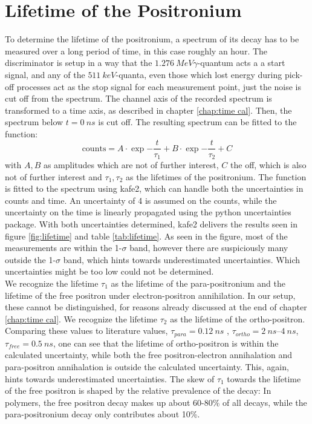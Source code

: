 \section{Lifetime of the Positronium}

To determine the lifetime of the positronium, a spectrum of its decay has to be measured over a long period of time, in this case roughly an hour. The discriminator is setup in a way that the $\SI{1.276}{MeV} \gamma$-quantum acts a a start signal, and any of the $\SI{511}{keV}$-quanta, even those which lost energy during pick-off processes act as the stop signal for each measurement point, just the noise is cut off from the spectrum. 
The channel axis of the recorded spectrum is transformed to a time axis, as described in chapter \ref{chap:time cal}. Then, the spectrum below $t = \SI{0}{ns}$ is cut off. The resulting spectrum can be fitted to the function: 
$$\mathrm{counts} = A\cdot\exp{-\frac{t}{\tau_1}}+ B\cdot\exp{-\frac{t}{\tau_2}} + C $$
with $A,B$ as amplitudes which are not of further interest, $C$ the off, which is also not of further interest and $\tau_1, \tau_2$ as the lifetimes of the positronium.
The function is fitted to the spectrum using kafe2, which can handle both the uncertainties in counts and time. An uncertainty of 4 is assumed on the counts, while the uncertainty on the time is linearly propagated using the python uncertainties package. With both uncertainties determined, kafe2 delivers the results seen in figure \ref{fig:lifetime} and table \ref{tab:lifetime}. As seen in the figure, most of the measurements are within the 1-$\sigma$ band, however there are suspiciously many outside the 1-$\sigma$ band, which hints towards underestimated uncertainties. Which uncertainties might be too low could not be determined.\\
We recognize the lifetime $\tau_1$ as the lifetime of the para-positronium and the lifetime of the free positron under electron-positron annihilation. In our setup, these cannot be distinguished, for reasons already discussed at the end of chapter \ref{chap:time cal}. We recognize the lifetime $\tau_2$ as the lifetime of the ortho-positron.
Comparing these values to literature values\cite{BlueBook}, $\tau_{para} = \SI{0.12}{ns}$ , $\tau_{ortho} = \SIrange[]{2}{4}{ns}$, $\tau_{free} = \SI{0.5}{ns}$, one can see that the lifetime of ortho-positron is within the calculated uncertainty, while both the free positron-electron annihalation and para-positron annihalation is outside the calculated uncertainty. This, again, hints towards underestimated uncertainties. The skew of $\tau_1$ towards the lifetime of the free positron is shaped by the relative prevalence of the decay: In polymers, the free positron decay makes up about 60-80\% of all decays, while the para-positronium decay only contributes about 10\%.



